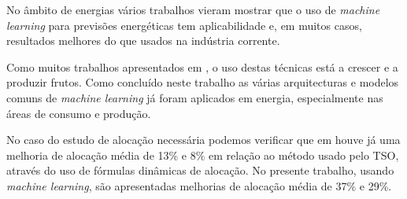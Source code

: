 No âmbito de energias vários trabalhos vieram mostrar que o uso de \textit{machine learning} para previsões energéticas tem aplicabilidade \cite{Stassen} e, em muitos casos, resultados melhores do que usados na indústria corrente. \cite{Ahmad2020, Antonopoulos2020} \par
Como muitos trabalhos apresentados em \cite{Benti2023}, o uso destas técnicas está a crescer e a produzir frutos. Como concluído neste trabalho as várias arquitecturas e modelos comuns de \textit{machine learning} já foram aplicados em energia, especialmente nas áreas de consumo e produção.\par
No caso do estudo de alocação necessária podemos verificar que em \cite{Algarvio2024} houve já uma melhoria de alocação média de 13\% e 8\% em relação ao método usado pelo \gls{TSO}, através do uso de fórmulas dinâmicas de alocação. No presente trabalho, usando \textit{machine learning}, são apresentadas melhorias de alocação média de 37\% e 29\%.\par






